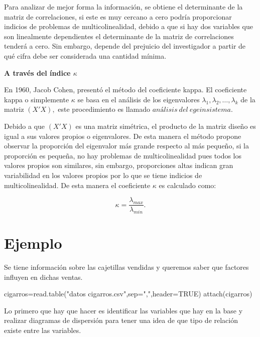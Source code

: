 \documentclass[
  a4paper,
  oneside,
  openany]{book}
\newenvironment{Shaded}{\begin{snugshade}}{\end{snugshade}}
\newcommand{\AttributeTok}[1]{\textcolor[rgb]{0.77,0.63,0.00}{#1}}
\newcommand{\ConstantTok}[1]{\textcolor[rgb]{0.00,0.00,0.00}{#1}}
\newcommand{\FunctionTok}[1]{\textcolor[rgb]{0.00,0.00,0.00}{#1}}
\newcommand{\NormalTok}[1]{#1}
\newcommand{\OtherTok}[1]{\textcolor[rgb]{0.56,0.35,0.01}{#1}}
\newcommand{\StringTok}[1]{\textcolor[rgb]{0.31,0.60,0.02}{#1}}
\begin{document}
Para analizar de mejor forma la información, se obtiene el determinante de la matriz de correlaciones, si este es muy cercano a cero podría proporcionar indicios de problemas de multicolinealidad, debido a que si hay dos variables que son linealmente dependientes el determinante de la matriz de correlaciones tenderá a cero. Sin embargo, depende del prejuicio del investigador a partir de qué cifra debe ser considerada una cantidad mínima.

\textbf{A través del índice \(\kappa\)}

En 1960, Jacob Cohen, presentó el método del coeficiente kappa. El coeficiente kappa o simplemente \(\kappa\) se basa en el análisis de los eigenvalores \(\lambda_{1},\lambda_{2},\ldots,\lambda_{k}\) de la matriz \((X'X),\) este procedimiento es llamado \(análisis \ del \ egeinsistema.\)

Debido a que \((X'X)\) es una matriz simétrica, el producto de la matriz diseño es igual a sus valores propios o eigenvalores. De esta manera el método propone observar la proporción del eigenvalor más grande respecto al más pequeño, si la proporción es pequeña, no hay problemas de multicolinealidad pues todos los valores propios son similares, sin embargo, proporciones altas indican gran variabilidad en los valores propios por lo que se tiene indicios de multicolinealidad.
De esta manera el coeficiente \(\kappa\) es calculado como:

\[\kappa=\frac{\lambda_{max}}{\lambda_{min}}.\]

\hypertarget{ejemplo-20}{%
\section{Ejemplo}\label{ejemplo-20}}

Se tiene información sobre las cajetillas vendidas y queremos saber que factores influyen en dichas ventas.

\begin{Shaded}
\begin{Highlighting}[]
\NormalTok{cigarros}\OtherTok{=}\FunctionTok{read.table}\NormalTok{(}\StringTok{"datos cigarros.csv"}\NormalTok{,}\AttributeTok{sep=}\StringTok{","}\NormalTok{,}\AttributeTok{header=}\ConstantTok{TRUE}\NormalTok{)}
\FunctionTok{attach}\NormalTok{(cigarros)}
\end{Highlighting}
\end{Shaded}

Lo primero que hay que hacer es identificar las variables que hay en la base y realizar diagramas de dispersión para tener una idea de que tipo de relación existe entre las variables.
\end{document}
